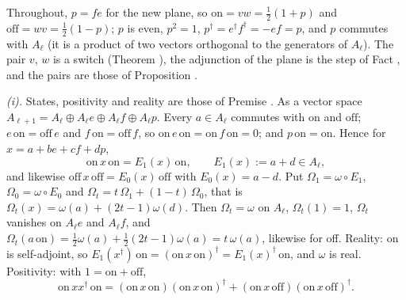 Throughout, $p = fe$ for the new plane, so $\mathrm{on} = vw = \tfrac12(1 + p)$ and $\mathrm{off} = wv = \tfrac12(1 - p)$; $p$ is even, $p^{2} = 1$, $p^{\dagger} = e^{\dagger}f^{\dagger} = -ef = p$, and $p$ commutes with $A_{\ell}$ (it is a product of two vectors orthogonal to the generators of $A_{\ell}$). The pair $v$, $w$ is a switch (Theorem ), the adjunction of the plane is the step of Fact , and the pairs are those of Proposition .

\emph{(i).} States, positivity and reality are those of Premise . As a vector space $A_{\ell+1} = A_{\ell} \oplus A_{\ell}e \oplus A_{\ell}f \oplus A_{\ell}p$. Every $a \in A_{\ell}$ commutes with $\mathrm{on}$ and $\mathrm{off}$; $e\,\mathrm{on} = \mathrm{off}\,e$ and $f\,\mathrm{on} = \mathrm{off}\,f$, so $\mathrm{on}\,e\,\mathrm{on} = \mathrm{on}\,f\,\mathrm{on} = 0$; and $p\,\mathrm{on} = \mathrm{on}$. Hence for $x = a + be + cf + dp$,
\[
\mathrm{on}\,x\,\mathrm{on} = E_{1}(x)\,\mathrm{on}, \qquad E_{1}(x) := a + d \in A_{\ell},
\]
and likewise $\mathrm{off}\,x\,\mathrm{off} = E_{0}(x)\,\mathrm{off}$ with $E_{0}(x) = a - d$. Put $\Omega_{1} = \omega \circ E_{1}$, $\Omega_{0} = \omega \circ E_{0}$ and $\Omega_{t} = t\,\Omega_{1} + (1 - t)\,\Omega_{0}$, that is $\Omega_{t}(x) = \omega(a) + (2t - 1)\omega(d)$. Then $\Omega_{t} = \omega$ on $A_{\ell}$, $\Omega_{t}(1) = 1$, $\Omega_{t}$ vanishes on $A_{\ell}e$ and $A_{\ell}f$, and $\Omega_{t}(a\,\mathrm{on}) = \tfrac12\omega(a) + \tfrac12(2t - 1)\omega(a) = t\,\omega(a)$, likewise for off. Reality: $\mathrm{on}$ is self-adjoint, so $E_{1}(x^{\dagger})\,\mathrm{on} = (\mathrm{on}\,x\,\mathrm{on})^{\dagger} = E_{1}(x)^{\dagger}\,\mathrm{on}$, and $\omega$ is real. Positivity: with $1 = \mathrm{on} + \mathrm{off}$,
\[
\mathrm{on}\,xx^{\dagger}\,\mathrm{on} = (\mathrm{on}\,x\,\mathrm{on})(\mathrm{on}\,x\,\mathrm{on})^{\dagger} + (\mathrm{on}\,x\,\mathrm{off})(\mathrm{on}\,x\,\mathrm{off})^{\dagger} .
\]
